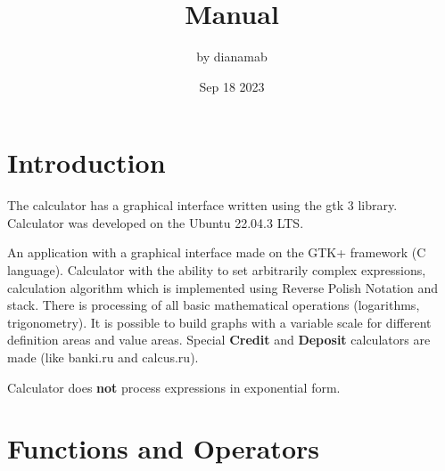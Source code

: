 \documentclass[12pt, a4paper]{article}
\title{Manual}
\author{by dianamab}
\date{Sep 18 2023}
\begin{document}
\maketitle

\pagebreak

\tableofcontents

\pagebreak

\section{Introduction}

The calculator has a graphical interface written using the gtk 3 library.
Calculator was developed on the Ubuntu 22.04.3 LTS.

An application with a graphical interface made on the GTK+ framework (C language). Calculator with the ability to set arbitrarily complex expressions, calculation algorithm
which is implemented using Reverse Polish Notation and stack. There is processing of all basic mathematical operations (logarithms, trigonometry). It is possible
to build graphs with a variable scale for different definition areas and value areas. Special \textbf{Credit} and \textbf{Deposit} calculators are made (like banki.ru and
calcus.ru).

Calculator does \textbf{not} process expressions in exponential form.

\pagebreak

\section{Functions and Operators}
\end{document}
